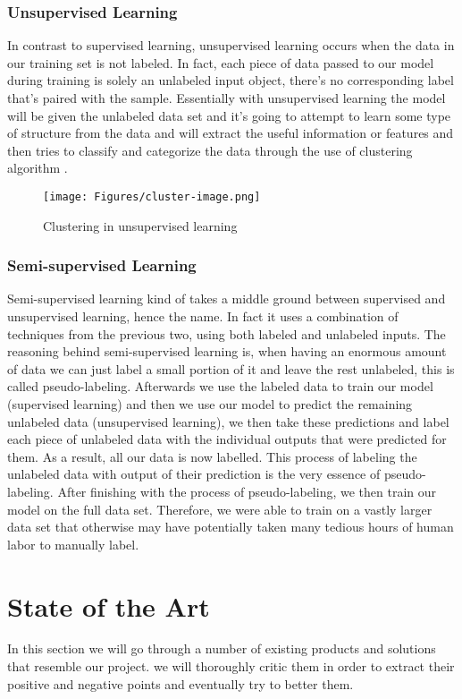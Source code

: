 \subsubsection{Unsupervised Learning}
In contrast to supervised learning, unsupervised learning occurs when the data in our training set is not labeled. In fact, each piece of data passed to our model during training is solely an unlabeled input object, there's no corresponding label that's paired with the sample. Essentially with unsupervised learning the model will be given the unlabeled data set and it's going to attempt to learn some type of structure from the data and will extract the useful information or features and then tries to classify and categorize the data through the use of clustering algorithm \cite{8}.
\begin{figure}[H]
\centering
\texttt{[image: Figures/cluster-image.png]}
\caption{Clustering in unsupervised learning}
\label{fig:Clustering in unsupervised learning}
\end{figure}

\subsubsection{Semi-supervised Learning} \label{semi-supervised}
Semi-supervised learning kind of takes a middle ground between supervised and unsupervised learning, hence the name. In fact it uses a combination of techniques from the previous two, using both labeled and unlabeled inputs. The reasoning behind semi-supervised learning is, when having an enormous amount of data we can just label a small portion of it and leave the rest unlabeled, this is called pseudo-labeling. Afterwards we use the labeled data to train our model (supervised learning) and then we use our model to predict the remaining unlabeled data (unsupervised learning), we then take these predictions and label each piece of unlabeled data with the individual outputs that were predicted for them. As a result, all our data is now labelled. This process of labeling the unlabeled data with output of their prediction is the very essence of pseudo-labeling. After finishing with the process of pseudo-labeling, we then train our model on the full data set. Therefore, we were able to train on a vastly larger data set that otherwise may have potentially taken many tedious hours of human labor to manually label\cite{9}.
\section{State of the Art}
In this section we will go through a number of existing products and solutions that resemble our project. we will thoroughly critic them in order to extract their positive and negative points and eventually try to better them.
